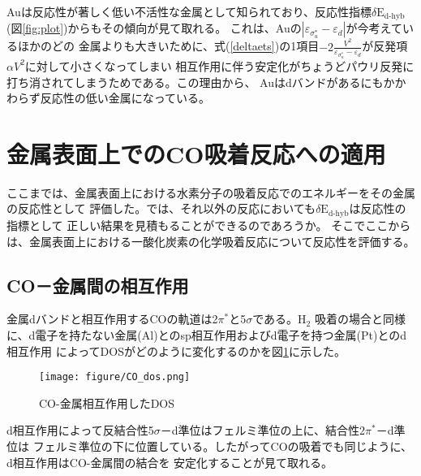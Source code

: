 \documentclass[12pt]{ltjsarticle}
\begin{document}
Auは反応性が著しく低い不活性な金属として知られており、反応性指標$\delta \text{E}_\text{d-hyb}$
(図\ref{fig:plot})からもその傾向が見て取れる。
これは、Auの$| \varepsilon _{\sigma_u^*} - \varepsilon _d|$が今考えているほかのどの
金属よりも大きいために、式(\ref{deltaets})の1項目$-2 \frac{ V^2 }{\varepsilon _
{\sigma_u^*} - \varepsilon _d}$が反発項$\alpha V^2$に対して小さくなってしまい
相互作用に伴う安定化がちょうどパウリ反発に打ち消されてしまうためである。この理由から、
Auはdバンドがあるにもかかわらず反応性の低い金属になっている。

\section{金属表面上でのCO吸着反応への適用}

ここまでは、金属表面上における水素分子の吸着反応でのエネルギーをその金属の反応性として
評価した。では、それ以外の反応においても$\delta \text{E}_\text{d-hyb}$は反応性の指標として
正しい結果を見積もることができるのであろうか。
そこでここからは、金属表面上における一酸化炭素の化学吸着反応について反応性を評価する。

\subsection{CO－金属間の相互作用}
金属dバンドと相互作用するCOの軌道は2$\pi^*$と5$\sigma$である。$\text{H}_\text{2}$
吸着の場合と同様に、d電子を持たない金属(Al)とのsp相互作用およびd電子を持つ金属(Pt)とのd相互作用
によってDOSがどのように変化するのかを図\ref{fig:codos}に示した。\cite{Hammer1996}
\begin{figure}[hbtp]
    \begin{center}
     \texttt{[image: figure/CO\_dos.png]}
    \end{center}
    \caption{CO-金属相互作用したDOS}
    \label{fig:codos}
\end{figure}

d相互作用によって反結合性5$\sigma$－d準位はフェルミ準位の上に、結合性2$\pi^*$－d準位は
フェルミ準位の下に位置している。したがってCOの吸着でも同じように、d相互作用はCO-金属間の結合を
安定化することが見て取れる。
\end{document}
